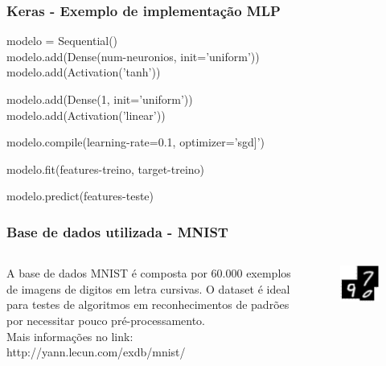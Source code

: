 \documentclass[tikz,10pt]{beamer}
\begin{document}
\begin{frame}
	\frametitle{Keras - Exemplo de implementação MLP}
	
	
	modelo = Sequential() \\
	modelo.add(Dense(num-neuronios, init='uniform'))\\
	modelo.add(Activation('tanh')) \newline
	
	modelo.add(Dense(1, init='uniform')) \\
	modelo.add(Activation('linear')) \newline
	
	modelo.compile(learning-rate=0.1, optimizer='sgd]') \newline
	
	modelo.fit(features-treino, target-treino) \newline
	
	modelo.predict(features-teste)
	
\end{frame} 

\begin{frame}
	\frametitle{Base de dados utilizada - MNIST}
	
	\begin{columns}
		\begin{column}{0.48\textwidth}
			A base de dados MNIST é composta por 60.000 exemplos de
			imagens de digitos em letra cursivas. O dataset é ideal para
			testes de algoritmos em reconhecimentos de padrões por
			necessitar pouco pré-processamento.\\
			Mais informações no link: http://yann.lecun.com/exdb/mnist/
		\end{column}
		\begin{column}{0.48\textwidth}
			\begin{figure}
				\centering
				\includegraphics[scale=0.35]{minst}
			\end{figure}
		\end{column}
	\end{columns}
	
	
\end{frame}
\end{document}
